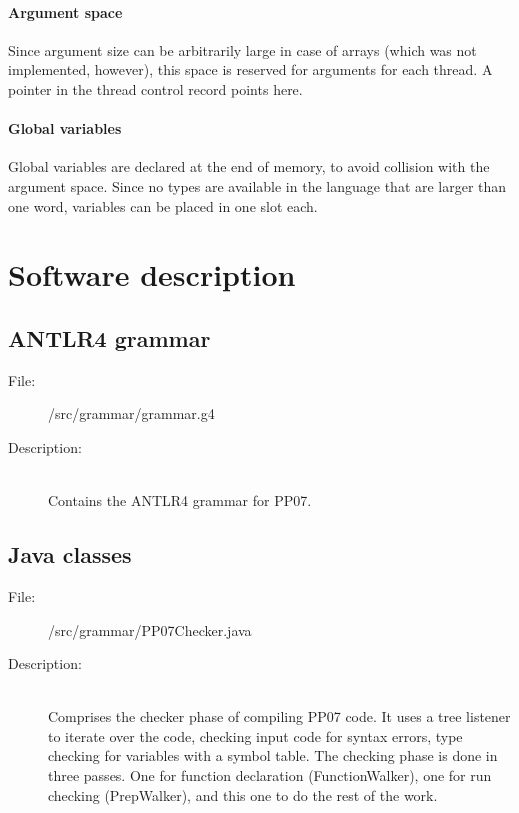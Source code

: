 \documentclass[10pt,a4paper]{report}
\begin{document}
\subsubsection{Argument space}
Since argument size can be arbitrarily large in case of arrays (which was not implemented, however), this space is reserved for arguments for each thread. A pointer in the thread control record points here.
       
\subsubsection{Global variables}
Global variables are declared at the end of memory, to avoid collision with the argument space. Since no types are available in the language that are larger than one word, variables can be placed in one slot each.


\chapter{Software description}

\section{ANTLR4 grammar}

\begin{description}
	\item[File:] /src/grammar/grammar.g4
	\item[Description:] \hfill \\
		Contains the ANTLR4 grammar for PP07.
\end{description}


\section{Java classes}

\begin{description}
	\item[File:] /src/grammar/PP07Checker.java
	\item[Description:] \hfill \\
		Comprises the checker phase of compiling PP07 code. It uses a tree listener to iterate over the code, checking input code for syntax errors, type checking for variables with a symbol table. The checking phase is done in three passes. One for function declaration (FunctionWalker), one for run checking (PrepWalker), and this one to do the rest of the work.
\end{description}
\end{document}
